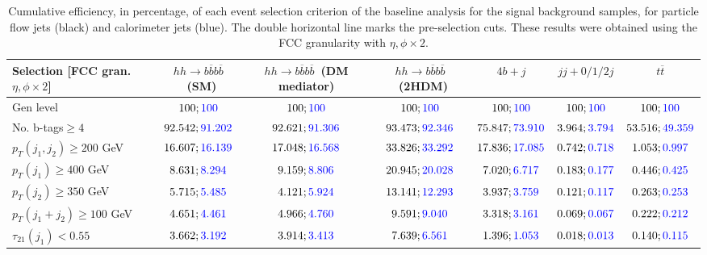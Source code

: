 \begin{landscape}
		\begin{table}
			\centering
			\caption{Cumulative efficiency, in percentage, of each event selection criterion of the baseline analysis for the signal background samples, for particle flow jets (black) and calorimeter jets (blue). The double horizontal line marks the pre-selection cuts. These results were obtained using the FCC granularity with $\eta,\phi\times 2$.}
			\begin{tabular}{lcccccc}
				\toprule 
				\textbf{Selection [FCC gran. $\eta,\phi\times2$]} & $hh\rightarrow b\overline{b}b\overline{b}$~(SM) & $hh\rightarrow b\overline{b}b\overline{b}$~(DM mediator) & $hh\rightarrow b\overline{b}b\overline{b}$~(2HDM) & $4b+j$  & $jj+0/1/2 j$ & $t\overline{t}$ \\
				\midrule
				Gen level & $100;\textcolor{blue}{100}$ & $100;\textcolor{blue}{100}$ &$100;\textcolor{blue}{100}$& $100;\textcolor{blue}{100}$& $100;\textcolor{blue}{100}$& $100;\textcolor{blue}{100}$ \\
				\rowcolor{black!7}No. b-tags$\geq 4$&$92.542;\textcolor{blue}{91.202}$&$92.621;\textcolor{blue}{91.306}$&$93.473;\textcolor{blue}{92.346}$&$75.847;\textcolor{blue}{73.910}$&$3.964;\textcolor{blue}{3.794}$&$53.516;\textcolor{blue}{49.359}$\\
				$p_T(j_1,j_2)\geq200$ GeV & $16.607;\textcolor{blue}{16.139}$ & $17.048;\textcolor{blue}{16.568}$&$33.826;\textcolor{blue}{33.292}$ &$17.836;\textcolor{blue}{17.085}$&$0.742;\textcolor{blue}{0.718}$&$1.053;\textcolor{blue}{0.997}$\\
				\midrule \midrule
				\rowcolor{black!7}$p_T(j_1)\geq 400$ GeV & $8.631;\textcolor{blue}{8.294}$ &$9.159;\textcolor{blue}{8.806}$  &$20.945;\textcolor{blue}{20.028}$&$7.020;\textcolor{blue}{6.717}$&$0.183;\textcolor{blue}{0.177}$&$0.446;\textcolor{blue}{0.425}$\\ 
				$p_T(j_2)\geq 350$ GeV & $5.715;\textcolor{blue}{5.485}$& $4.121;\textcolor{blue}{5.924}$&$13.141;\textcolor{blue}{12.293}$&$3.937;\textcolor{blue}{3.759}$&$0.121;\textcolor{blue}{0.117}$&$0.263;\textcolor{blue}{0.253}$\\
				\rowcolor{black!7}$p_T(j_1+j_2)\geq 100$ GeV &$4.651;\textcolor{blue}{4.461}$ & $4.966;\textcolor{blue}{4.760}$ &$9.591;\textcolor{blue}{9.040}$&$3.318;\textcolor{blue}{3.161}$&$0.069;\textcolor{blue}{0.067}$&$0.222;\textcolor{blue}{0.212}$\\
				$\tau_{21}(j_1)<0.55$ & $3.662;\textcolor{blue}{3.192}$& $3.914;\textcolor{blue}{3.413}$&$7.639;\textcolor{blue}{6.561}$&$1.396;\textcolor{blue}{1.053}$&$0.018;\textcolor{blue}{0.013}$&$0.140;\textcolor{blue}{0.115}$\\

\end{tabular}
\end{table}
\end{landscape}
